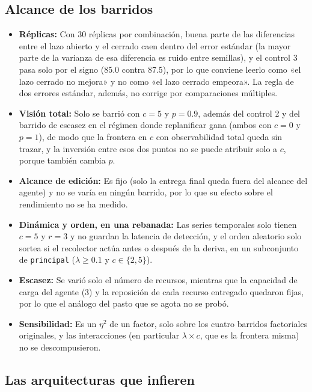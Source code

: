 \subsection*{Alcance de los barridos}

\begin{itemize}[leftmargin=1.4em, itemsep=0.3em]
  \item \textbf{Réplicas:} Con 30 réplicas por combinación, buena parte de las diferencias entre el lazo abierto y el cerrado caen dentro del error estándar (la mayor parte de la varianza de esa diferencia es ruido entre semillas), y el control 3 pasa solo por el signo (85.0 contra 87.5), por lo que conviene leerlo como «el lazo cerrado no mejora» y no como «el lazo cerrado empeora». La regla de dos errores estándar, además, no corrige por comparaciones múltiples.
  \item \textbf{Visión total:} Solo se barrió con $c=5$ y $p=0.9$, además del control 2 y del barrido de escasez en el régimen donde replanificar gana (ambos con $c=0$ y $p=1$), de modo que la frontera en $c$ con observabilidad total queda sin trazar, y la inversión entre esos dos puntos no se puede atribuir solo a $c$, porque también cambia $p$.
  \item \textbf{Alcance de edición:} Es fijo (solo la entrega final queda fuera del alcance del agente) y no se varía en ningún barrido, por lo que su efecto sobre el rendimiento no se ha medido.
  \item \textbf{Dinámica y orden, en una rebanada:} Las series temporales solo tienen $c=5$ y $r=3$ y no guardan la latencia de detección, y el orden aleatorio solo sortea si el recolector actúa antes o después de la deriva, en un subconjunto de \texttt{principal} ($\lambda\ge0.1$ y $c\in\{2,5\}$).
  \item \textbf{Escasez:} Se varió solo el número de recursos, mientras que la capacidad de carga del agente (3) y la reposición de cada recurso entregado quedaron fijas, por lo que el análogo del pasto que se agota no se probó.
  \item \textbf{Sensibilidad:} Es un $\eta^2$ de un factor, solo sobre los cuatro barridos factoriales originales, y las interacciones (en particular $\lambda\times c$, que es la frontera misma) no se descompusieron.
\end{itemize}

\subsection*{Las arquitecturas que infieren}

